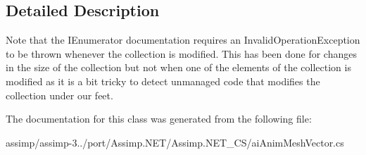 \subsection{Detailed Description}
Note that the I\+Enumerator documentation requires an Invalid\+Operation\+Exception to be thrown whenever the collection is modified. This has been done for changes in the size of the collection but not when one of the elements of the collection is modified as it is a bit tricky to detect unmanaged code that modifies the collection under our feet. 

The documentation for this class was generated from the following file\+:\begin{DoxyCompactItemize}
\item 
assimp/assimp-\/3../port/\+Assimp.\+N\+E\+T/\+Assimp.\+N\+E\+T\+\_\+\+C\+S/ai\+Anim\+Mesh\+Vector.\+cs\end{DoxyCompactItemize}

